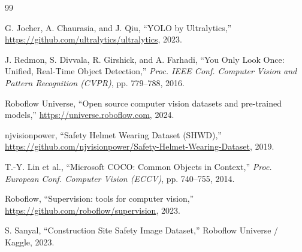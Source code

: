\documentclass[conference]{IEEEtran}
\begin{document}
\begin{thebibliography}{99}

G. Jocher, A. Chaurasia, and J. Qiu,
``YOLO by Ultralytics,''
\url{https://github.com/ultralytics/ultralytics}, 2023.

J. Redmon, S. Divvala, R. Girshick, and A. Farhadi,
``You Only Look Once: Unified, Real-Time Object Detection,''
\emph{Proc. IEEE Conf. Computer Vision and Pattern Recognition
(CVPR)}, pp. 779--788, 2016.

Roboflow Universe,
``Open source computer vision datasets and pre-trained models,''
\url{https://universe.roboflow.com}, 2024.

njvisionpower,
``Safety Helmet Wearing Dataset (SHWD),''
\url{https://github.com/njvisionpower/Safety-Helmet-Wearing-Dataset},
2019.

T.-Y. Lin et al.,
``Microsoft COCO: Common Objects in Context,''
\emph{Proc. European Conf. Computer Vision (ECCV)}, pp. 740--755,
2014.

Roboflow,
``Supervision: tools for computer vision,''
\url{https://github.com/roboflow/supervision}, 2023.

S. Sanyal,
``Construction Site Safety Image Dataset,''
Roboflow Universe / Kaggle, 2023.

\end{thebibliography}
\end{document}
